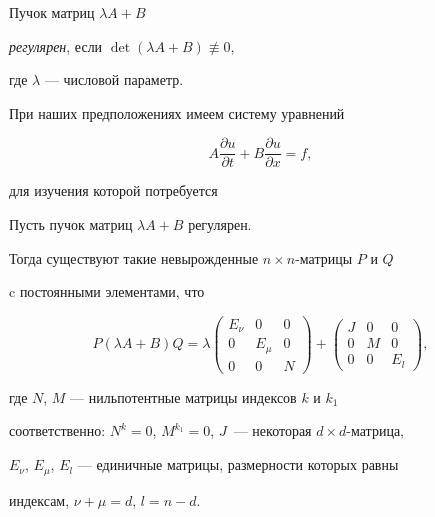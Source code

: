 \begin{defns}


Пучок матриц $\lambda A+B$


{\em регулярен}, если $\det (\lambda A+B)\not \equiv 0$,


где $\lambda$ --- числовой параметр.


\end{defns}





При наших предположениях имеем систему уравнений


\begin{equation}


A\frac{\partial u}{\partial t}+B\frac{\partial u}{\partial x}=f,


\end{equation}


для изучения которой потребуется





\begin{lems}


Пусть пучок матриц $\lambda A + B$ регулярен.


Тогда существуют такие невырожденные $n\times n$-матрицы $P$ и $Q$


c постоянными элементами, что


\begin{equation}


P(\lambda A+B)Q=


\lambda


\begin{pmatrix}


E_\nu & 0 & 0\\ 0 & E_{\mu }&0\\ 0 & 0 & N


\end{pmatrix}+


\begin{pmatrix}


J&0&0\\ 0 & M & 0\\ 0 & 0 & E_l


\end{pmatrix},


\end{equation}


где $N$, $M$ --- нильпотентные матрицы индексов $k$ и $k_1$


соответственно: $N^k=0$, $M^{k_1}=0$, $J$~--- некоторая $d\times d$-матрица,


$E_\nu$, $E_{\mu }$, $E_l$ --- единичные матрицы, размерности которых равны


индексам, $\nu + \mu = d$, $l=n-d$.


\end{lems}





